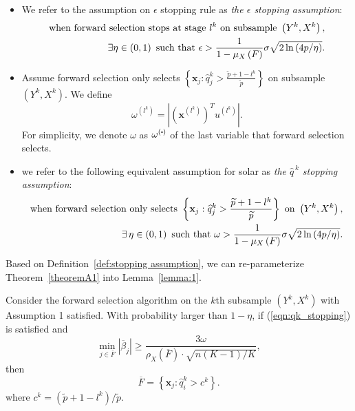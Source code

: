 \documentclass[11pt,review,authoryear]{elsarticle}
\begin{document}
\begin{appendices}
\begin{itemize}
  \item We refer to the \citet{zhang09} assumption on $\epsilon$ stopping rule as \emph{the $\epsilon$ stopping assumption}:
  \begin{eqnarray}
    \mbox{when forward selection stops at stage } l^k \mbox{ on subsample } \left(Y^k, X^k\right), \\ \notag
    \exists \eta \in \left( 0, 1\right) \mbox{ such that }\epsilon>\frac{1}{1-\mu_{X}\left(F\right)}\sigma\sqrt{2\ln\left(4p/\eta\right)}.
  \end{eqnarray}
  \item Assume forward selection only selects $\left\{ \mathbf{x}_j:\widehat{q}_j^k > \frac{\widetilde{p} + 1 - l^k} {\widetilde{p}} \right\}$ on subsample $\left(Y^k, X^k \right)$. We define
  \begin{displaymath}
    \omega^{\left(l^k\right)} = \left\vert \left( \mathbf{x}^{\left( l^k \right)}\right) ^T u^{\left(l^k \right)} \right\vert.
  \end{displaymath}
  For simplicity, we denote $\omega$ as $\omega^{\left( \bigcdot \right)}$ of the last variable that forward selection selects.
  \item we refer to the following equivalent assumption for solar as \emph{the $\widehat{q}^{\,k}$ stopping assumption}:
  \begin{align}
    \mbox{when forward selection only selects } \left\{ \mathbf{x}_j:\widehat{q}_j^k > \frac{\widetilde{p} + 1 - l^k} {\widetilde{p}} \right\} \mbox{ on } \left(Y^k, X^k \right), \notag \\
    \exists\, \eta \in \left( 0, 1\right) \mbox{ such that } \omega >\frac{1}{1-\mu_{X}\left(F\right)}\sigma\sqrt{2\ln\left(4p/\eta\right)}. \label{eqn:qk_stopping}
  \end{align}
\end{itemize}
\medskip

Based on Definition~\ref{def:stopping assumption}, we can re-parameterize Theorem~\ref{theoremA1} into Lemma~\ref{lemma:1}.

\begin{lemma}
  Consider the forward selection algorithm on the $k$th subsample $\left(Y^{k},X^{k}\right)$ with Assumption 1 satisfied. With probability larger than $1-\eta$, if (\ref{eqn:qk_stopping}) is satisfied and
  \begin{displaymath}
      \min_{j\in\overline{F}}\left|\overline{\beta}_{j}\right|\geqslant\frac{3\omega}{\rho_{X}\left(\overline{F}\right)\cdot\sqrt{n\left(K-1\right)/K}},
  \end{displaymath}
  then
  \begin{displaymath}
      \overline{F}=\left\{ \mathbf{x}_{j}:\widehat{q}_{i}^{k}>c^k\right\}.
  \end{displaymath}
  where $c^k = \left(\widetilde{p} + 1 - l^k\right) / \widetilde{p}$.
  \label{lemma:1}
\end{lemma}


\end{appendices}
\end{document}
